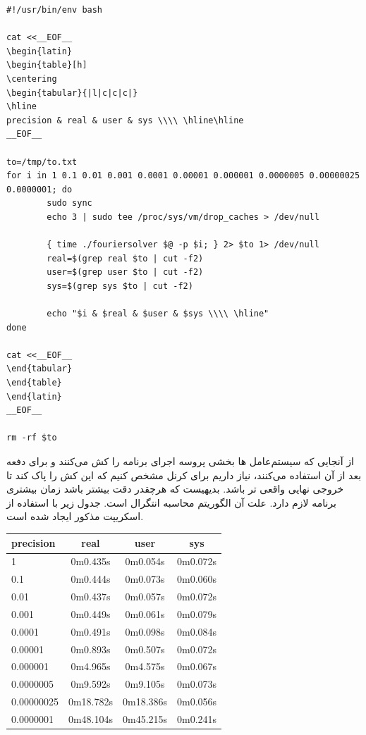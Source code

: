 \documentclass[a4paper]{report}
\begin{document}
\begin{latin}
\begin{verbatim}
#!/usr/bin/env bash

cat <<__EOF__
\begin{latin}
\begin{table}[h]
\centering
\begin{tabular}{|l|c|c|c|}
\hline
precision & real & user & sys \\\\ \hline\hline
__EOF__

to=/tmp/to.txt
for i in 1 0.1 0.01 0.001 0.0001 0.00001 0.000001 0.0000005 0.00000025 0.0000001; do
        sudo sync
        echo 3 | sudo tee /proc/sys/vm/drop_caches > /dev/null

        { time ./fouriersolver $@ -p $i; } 2> $to 1> /dev/null
        real=$(grep real $to | cut -f2)
        user=$(grep user $to | cut -f2)
        sys=$(grep sys $to | cut -f2)

        echo "$i & $real & $user & $sys \\\\ \hline"
done

cat <<__EOF__
\end{tabular}
\end{table}
\end{latin}
__EOF__

rm -rf $to

\end{verbatim}
\end{latin}
از آنجایی که سیستم‌عامل ها بخشی پروسه اجرای برنامه را کش می‌کنند و برای دفعه بعد از آن استفاده می‌کنند، نیاز داریم
برای کرنل مشخص کنیم که این کش را پاک کند تا خروجی نهایی واقعی تر باشد. بدیهیست که هرچقدر دقت بیشتر باشد زمان
بیشتری برنامه لازم دارد. علت آن الگوریتم محاسبه انتگرال است. جدول زیر با استفاده از اسکریپت مذکور ایجاد شده است.

\begin{latin}
\begin{table}[ht]
\centering
\begin{tabular}{|l|c|c|c|}
\hline
precision & real & user & sys \\\hline\hline
1 & 0m0.435s & 0m0.054s & 0m0.072s \\ \hline
0.1 & 0m0.444s & 0m0.073s & 0m0.060s \\ \hline
0.01 & 0m0.437s & 0m0.057s & 0m0.072s \\ \hline
0.001 & 0m0.449s & 0m0.061s & 0m0.079s \\ \hline
0.0001 & 0m0.491s & 0m0.098s & 0m0.084s \\ \hline
0.00001 & 0m0.893s & 0m0.507s & 0m0.072s \\ \hline
0.000001 & 0m4.965s & 0m4.575s & 0m0.067s \\ \hline
0.0000005 & 0m9.592s & 0m9.105s & 0m0.073s \\ \hline
0.00000025 & 0m18.782s & 0m18.386s & 0m0.056s \\ \hline
0.0000001 & 0m48.104s & 0m45.215s & 0m0.241s \\ \hline
\end{tabular}
\end{table}
\end{latin}
\end{document}
